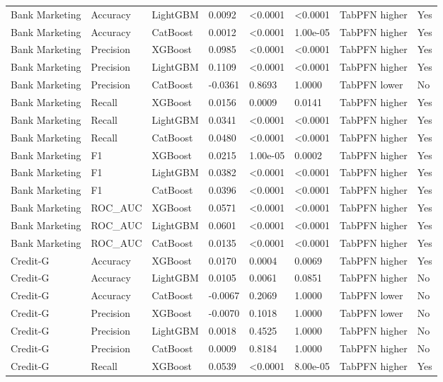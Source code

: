 \begin{longtable}{p{2.6cm}p{1.75cm}p{1.55cm}R{1.1cm}R{1.7cm}R{1.4cm}p{2.2cm}p{1.75cm}}
Bank Marketing & Accuracy & LightGBM & 0.0092 & <0.0001 & <0.0001 & TabPFN higher & Yes \\
Bank Marketing & Accuracy & CatBoost & 0.0012 & <0.0001 & 1.00e-05 & TabPFN higher & Yes \\
Bank Marketing & Precision & XGBoost & 0.0985 & <0.0001 & <0.0001 & TabPFN higher & Yes \\
Bank Marketing & Precision & LightGBM & 0.1109 & <0.0001 & <0.0001 & TabPFN higher & Yes \\
Bank Marketing & Precision & CatBoost & -0.0361 & 0.8693 & 1.0000 & TabPFN lower & No \\
Bank Marketing & Recall & XGBoost & 0.0156 & 0.0009 & 0.0141 & TabPFN higher & Yes \\
Bank Marketing & Recall & LightGBM & 0.0341 & <0.0001 & <0.0001 & TabPFN higher & Yes \\
Bank Marketing & Recall & CatBoost & 0.0480 & <0.0001 & <0.0001 & TabPFN higher & Yes \\
Bank Marketing & F1 & XGBoost & 0.0215 & 1.00e-05 & 0.0002 & TabPFN higher & Yes \\
Bank Marketing & F1 & LightGBM & 0.0382 & <0.0001 & <0.0001 & TabPFN higher & Yes \\
Bank Marketing & F1 & CatBoost & 0.0396 & <0.0001 & <0.0001 & TabPFN higher & Yes \\
Bank Marketing & ROC\_AUC & XGBoost & 0.0571 & <0.0001 & <0.0001 & TabPFN higher & Yes \\
Bank Marketing & ROC\_AUC & LightGBM & 0.0601 & <0.0001 & <0.0001 & TabPFN higher & Yes \\
Bank Marketing & ROC\_AUC & CatBoost & 0.0135 & <0.0001 & <0.0001 & TabPFN higher & Yes \\
Credit-G & Accuracy & XGBoost & 0.0170 & 0.0004 & 0.0069 & TabPFN higher & Yes \\
Credit-G & Accuracy & LightGBM & 0.0105 & 0.0061 & 0.0851 & TabPFN higher & No \\
Credit-G & Accuracy & CatBoost & -0.0067 & 0.2069 & 1.0000 & TabPFN lower & No \\
Credit-G & Precision & XGBoost & -0.0070 & 0.1018 & 1.0000 & TabPFN lower & No \\
Credit-G & Precision & LightGBM & 0.0018 & 0.4525 & 1.0000 & TabPFN higher & No \\
Credit-G & Precision & CatBoost & 0.0009 & 0.8184 & 1.0000 & TabPFN higher & No \\
Credit-G & Recall & XGBoost & 0.0539 & <0.0001 & 8.00e-05 & TabPFN higher & Yes \\

\end{longtable}
